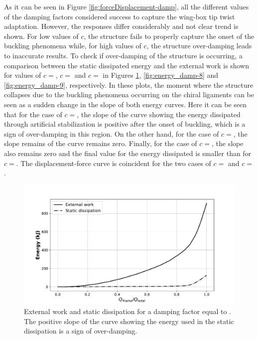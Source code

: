     As it can be seen in Figure \ref{fig:forceDisplacement-damp}, all the different values of the damping factors considered success to capture the wing-box tip twist adaptation. However, the responses differ considerably and not clear trend is shown. For low values of $c$, the structure fails to properly capture the onset of the buckling phenomena while, for high values of $c$, the structure over-damping leads to inaccurate results. To check if over-damping of the structure is occurring, a comparison between the static dissipated energy and the external work is shown for values of $c =$, $c =$ and $c =$ in Figures \ref{fig:energy_damp-5}, \ref{fig:energy_damp-8} and \ref{fig:energy_damp-9}, respectively. In these plots, the moment where the structure collapses due to the buckling phenomena occurring on the chiral ligaments can be seen as a sudden change in the slope of both energy curves. Here it can be seen that for the case of $c =$, the slope of the curve showing the energy dissipated through artificial stabilization is positive after the onset of buckling, which is a sign of over-damping in this region. On the other hand, for the case of $c =$, the slope remains of the curve remains zero. Finally, for the case of $c =$, the slope also remains zero and the final value for the energy dissipated is smaller than for $c =$. The displacement-force curve is coincident for the two cases of $c =$ and $c =$.

    \begin{figure}[!htpb]
      \centering
      \includegraphics[width=0.8 \textwidth]{figures/result-model/energy_damp-5}
      \caption[External work and static dissipation for a damping factor equal to ]{External work and static dissipation for a damping factor equal to . The positive slope of the curve showing the energy used in the static dissipation is a sign of over-damping.}\label{fig:energy_damp-5}
    \end{figure}

